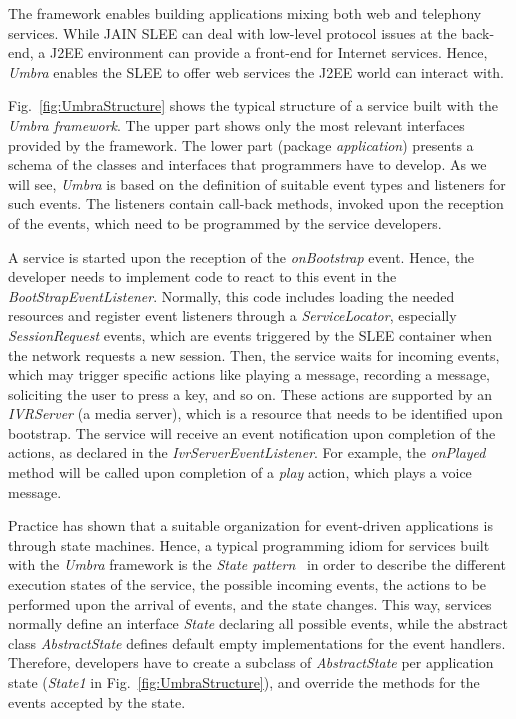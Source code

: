 The framework enables building applications mixing both web and telephony services.
While JAIN SLEE can deal with low-level protocol issues at the back-end, a J2EE environment can provide a 
front-end for Internet services. Hence, {\em Umbra} enables the SLEE to offer web services the J2EE world can interact with.

Fig.~\ref{fig:UmbraStructure} shows the typical structure of a service built with the {\em Umbra framework}. 
The upper part shows only the most relevant interfaces provided by the framework. The lower part (package 
{\em application}) presents a schema of the classes and interfaces that programmers have to develop. 
As we will see, {\em Umbra} is based on the definition of suitable event types and listeners for such events. The
listeners contain call-back methods, invoked upon the reception of the events, which need to be programmed
by the service developers.


A service is started upon the reception of the {\em onBootstrap} event. Hence, the developer needs to 
implement code to react to this event in the {\em BootStrapEventListener}. Normally, 
this code includes loading the needed resources and register event listeners  
through a {\em ServiceLocator}, especially {\em SessionRequest} events, which are events triggered by 
the SLEE container when the network requests a new session. Then, the service waits for incoming events, which
may trigger specific actions like playing a message, recording a message, soliciting the user to press a key,  
and so on. These actions are supported by an {\em IVRServer} (a media server), which is a resource
that needs to be identified upon bootstrap. The service will receive an event notification upon completion of the 
actions, as declared in the {\em IvrServerEventListener}. For example, the {\em onPlayed} method will be 
called upon completion of a {\em play} action, which plays a voice message.

Practice has shown that a suitable organization for event-driven applications is through state machines.
Hence, a typical programming idiom for services built with the {\em Umbra} framework is the {\em State 
pattern}~\cite{Gamma} in order to describe the different execution states of the service, the possible 
incoming events, the actions to be performed upon the arrival of events, and the state changes. This way,
services normally define an interface {\em State} declaring all possible events, while the abstract class 
{\em AbstractState} defines default empty implementations for the event handlers. Therefore, developers 
have to create a subclass of {\em AbstractState} per application state ({\em State1} in Fig.~\ref{fig:UmbraStructure}), 
and override the methods for the events accepted by the state.

